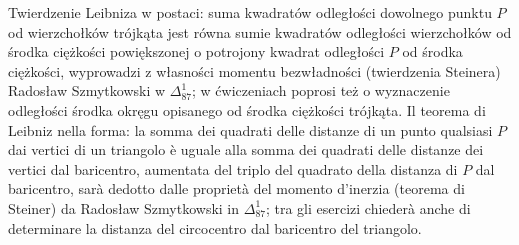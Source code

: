 Twierdzenie Leibniza w postaci: suma kwadratów odległości dowolnego punktu $P$ od wierzchołków trójkąta jest równa sumie kwadratów odległości wierzchołków od środka ciężkości powiększonej o potrojony kwadrat odległości $P$ od środka ciężkości, wyprowadzi z własności momentu bezwładności (twierdzenia Steinera) Radosław Szmytkowski w $\Delta_{87}^{1}$; w ćwiczeniach poprosi też o wyznaczenie odległości środka okręgu opisanego od środka ciężkości trójkąta. %
Il teorema di Leibniz nella forma: la somma dei quadrati delle distanze di un punto qualsiasi $P$ dai vertici di un triangolo è uguale alla somma dei quadrati delle distanze dei vertici dal baricentro, aumentata del triplo del quadrato della distanza di $P$ dal baricentro, sarà dedotto dalle proprietà del momento d'inerzia (teorema di Steiner) da Radosław Szmytkowski in $\Delta_{87}^{1}$; tra gli esercizi chiederà anche di determinare la distanza del circocentro dal baricentro del triangolo. %

%